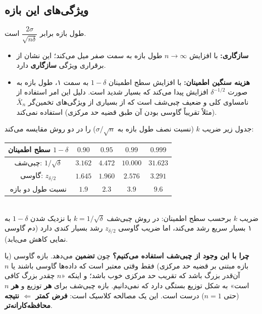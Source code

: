 \subsection{ویژگی‌های این بازه}
طول بازه برابر $\dfrac{2\sigma}{\sqrt{n\delta}}$ است.
\begin{itemize}
\item \textbf{سازگاری:} با افزایش $n\to\infty$ طول بازه به سمت صفر میل می‌کند؛ این نشان از برقراری ویژگی \textbf{سازگاری } دارد.
\item \textbf{هزینه سنگین اطمینان:} با افزایش سطح اطمینان $1-\delta$ به سمت ۱، طول بازه به صورت $\delta^{-1/2}$ افزایش پیدا می‌کند که بسیار شدید است. دلیل این امر استفاده از نامساوی کلی و ضعیف چبی‌شف است که از بسیاری از ویژگی‌های تخمین‌گر $\bar X_n$ (مثلاً تقریباً گاوسی بودن آن طبق قضیه حد مرکزی) استفاده نمی‌کند.
\end{itemize}

جدول زیر ضریب $k$ (نسبت نصف طول بازه به $\sigma/\sqrt n$) را در دو روش مقایسه می‌کند:
\begin{center}
\renewcommand{\arraystretch}{1.4}
\begin{tabular}{c|c|c|c|c}
سطح اطمینان $1-\delta$ & $0.90$ & $0.95$ & $0.99$ & $0.999$\\\hline
چبی‌شف: $1/\sqrt\delta$ & $3.162$ & $4.472$ & $10.000$ & $31.623$\\
گاوسی: $z_{\delta/2}$ & $1.645$ & $1.960$ & $2.576$ & $3.291$\\\hline
نسبت طول دو بازه & $1.9$ & $2.3$ & $3.9$ & $9.6$
\end{tabular}
\end{center}

\begin{center}
\begin{tikzpicture}
\end{tikzpicture}\\
{\small ضریب $k$ برحسب سطح اطمینان: در روش چبی‌شف $k=1/\sqrt\delta$ با نزدیک شدن $1-\delta$ به ۱ بسیار سریع رشد می‌کند، اما ضریب گاوسی $z_{\delta/2}$ رشد بسیار کندی دارد (دم گاوسی نمایی کاهش می‌یابد).}
\end{center}

\begin{note}
\notetitle \textbf{چرا با این وجود از چبی‌شف استفاده می‌کنیم؟} چون \textbf{تضمین} می‌دهد. بازه گاوسی (یا بازه مبتنی بر قضیه حد مرکزی) فقط وقتی معتبر است که داده‌ها گاوسی باشند یا $n$ آن‌قدر بزرگ باشد که تقریب حد مرکزی خوب باشد؛ و اینکه «$n$ چقدر بزرگ کافی است» به شکل توزیع بستگی دارد که نمی‌دانیم. بازه چبی‌شف برای \textbf{هر} توزیع و \textbf{هر} $n$ (حتی $n=1$) درست است. این یک مصالحه کلاسیک است: \textbf{فرض کمتر $\Leftarrow$ نتیجه محافظه‌کارانه‌تر}.
\end{note}

